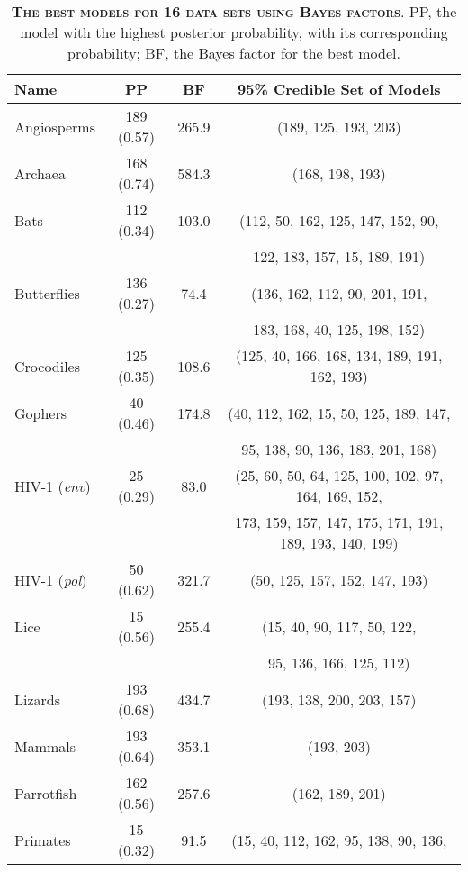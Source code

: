 \documentclass{svmult}
\begin{document}
\begin{table}[b]
\centering
\caption{\textbf{\textsc{The best models for 16 data sets using Bayes factors}}.
PP, the model with the highest posterior probability, with its corresponding probability; BF, the Bayes factor for the best model.}
\begin{tabular}{l c c c} \hline
Name & PP & BF & 95\% Credible Set of Models \\ \hline
Angiosperms               &  189 (0.57) & 265.9 & (189, 125, 193, 203) \\
Archaea                        & 168 (0.74) & 584.3 & (168, 198, 193) \\
Bats                               & 112 (0.34) & 103.0 & (112, 50, 162, 125, 147, 152, 90, \\
                                         &            &       & 122, 183, 157, 15, 189, 191) \\
Butterflies               & 136 (0.27) &  74.4 & (136, 162, 112, 90, 201, 191, \\
                            &            &       & 183, 168, 40, 125, 198, 152) \\
Crocodiles                 & 125 (0.35) & 108.6 & (125, 40, 166, 168, 134, 189, 191, 162, 193) \\
Gophers                   &  40 (0.46) & 174.8 & (40, 112, 162, 15, 50, 125, 189, 147, \\
                               &            &       & 95, 138, 90, 136, 183, 201, 168) \\
HIV-1 ({\it env})          &  25 (0.29) &  83.0 & (25, 60, 50, 64, 125, 100, 102, 97, 164, 169, 152,\\ 
                              &            &       & 173, 159, 157, 147, 175, 171, 191, 189, 193, 140, 199)\\ 
HIV-1 ({\it pol})       &  50 (0.62) & 321.7 & (50, 125, 157, 152, 147, 193) \\
Lice                      &  15 (0.56) & 255.4 & (15, 40, 90, 117, 50, 122, \\
                           &            &       & 95, 136, 166, 125, 112) \\
Lizards                   & 193 (0.68) & 434.7 & (193, 138, 200, 203, 157) \\
Mammals                    & 193 (0.64) & 353.1 & (193, 203) \\
Parrotfish                 & 162 (0.56) & 257.6 & (162, 189, 201) \\
Primates                   &  15 (0.32) &  91.5 & (15, 40, 112, 162, 95, 138, 90, 136, \\

\end{tabular}
\end{table}
\end{document}
